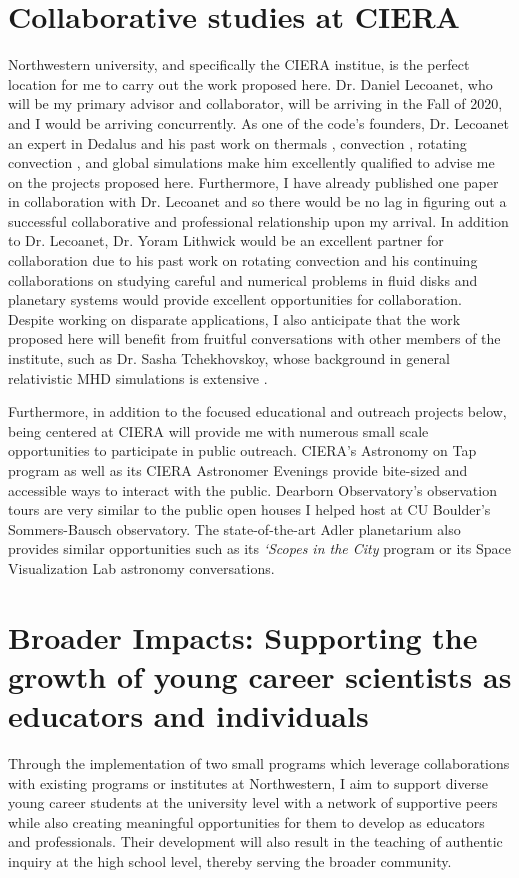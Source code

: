 \documentclass[aasms,12pt]{article}
\begin{document}
\section{Collaborative studies at CIERA}
\label{sct:northwestern}
Northwestern university, and specifically the CIERA institue, is the perfect location for me to carry out the work proposed here.
Dr. Daniel Lecoanet, who will be my primary advisor and collaborator, will be arriving in the Fall of 2020, and I would be arriving concurrently.
As one of the code's founders, Dr. Lecoanet an expert in Dedalus and his past work on thermals \citep{lecoanet&jeevanjee2019, tarshis&all2018}, convection \citep{lecoanet&quataert2013, lecoanet&all2014, couston&all2017}, rotating convection \citep{couston&all2019}, and global simulations \citep{lecoanet&all2018} make him excellently qualified to advise me on the projects proposed here.
Furthermore, I have already published one paper in collaboration with Dr. Lecoanet and so there would be no lag in figuring out a successful collaborative and professional relationship upon my arrival.
In addition to Dr. Lecoanet, Dr. Yoram Lithwick would be an excellent partner for collaboration due to his past work on rotating convection \citep{BDLithwick2014} and his continuing collaborations on studying careful and numerical problems in fluid disks \citep{LDLithwick2019} and planetary systems \citep{hadden&lithwick2018} would provide excellent opportunities for collaboration.
Despite working on disparate applications, I also anticipate that the work proposed here will benefit from fruitful conversations with other members of the institute, such as Dr. Sasha Tchekhovskoy, whose background in general relativistic MHD simulations is extensive \citep[as in e.g.,][]{tchekhovskoy&bromberg2016}.

Furthermore, in addition to the focused educational and outreach projects below, being centered at CIERA will provide me with numerous small scale opportunities to participate in public outreach.
CIERA's Astronomy on Tap program as well as its CIERA Astronomer Evenings provide bite-sized and accessible ways to interact with the public.
Dearborn Observatory's observation tours are very similar to the public open houses I helped host at CU Boulder's Sommers-Bausch observatory.
The state-of-the-art Adler planetarium also provides similar opportunities such as its \emph{`Scopes in the City} program or its Space Visualization Lab astronomy conversations.


\section{Broader Impacts: Supporting the growth of young career scientists as educators and individuals}
\label{sct:outreach}
Through the implementation of two small programs which leverage collaborations with existing programs or institutes at Northwestern, I aim to support diverse young career students at the university level with a network of supportive peers while also creating meaningful opportunities for them to develop as educators and professionals.
Their development will also result in the teaching of authentic inquiry at the high school level, thereby serving the broader community.
\end{document}
